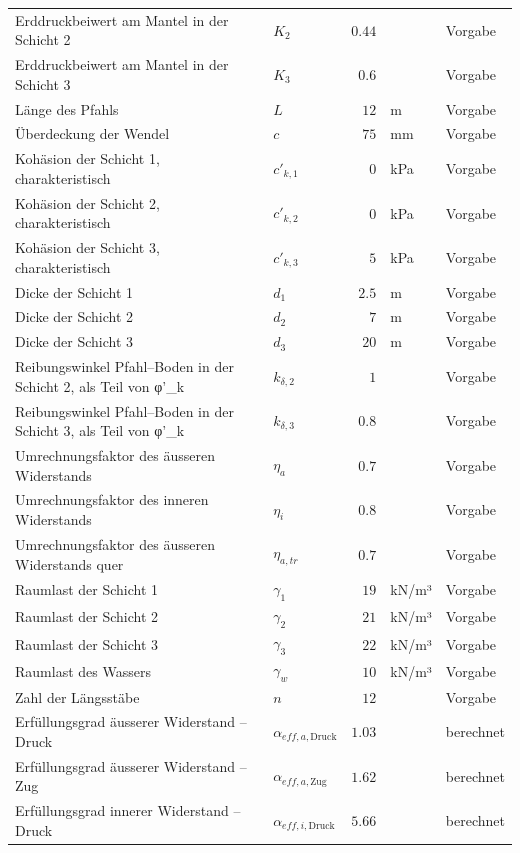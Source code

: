 \documentclass[11pt,a4paper]{article}
\begin{document}
\begin{xltabular}{\linewidth}{>{\raggedright\arraybackslash}Xlrll}
Erddruckbeiwert am Mantel in der Schicht 2 & $K_{2}$ & $0.44$ &  & Vorgabe \\
Erddruckbeiwert am Mantel in der Schicht 3 & $K_{3}$ & $0.6$ &  & Vorgabe \\
Länge des Pfahls & $L$ & $12$ & m & Vorgabe \\
Überdeckung der Wendel & $c$ & $75$ & mm & Vorgabe \\
Kohäsion der Schicht 1, charakteristisch & $c'_{k,1}$ & $0$ & kPa & Vorgabe \\
Kohäsion der Schicht 2, charakteristisch & $c'_{k,2}$ & $0$ & kPa & Vorgabe \\
Kohäsion der Schicht 3, charakteristisch & $c'_{k,3}$ & $5$ & kPa & Vorgabe \\
Dicke der Schicht 1 & $d_{1}$ & $2.5$ & m & Vorgabe \\
Dicke der Schicht 2 & $d_{2}$ & $7$ & m & Vorgabe \\
Dicke der Schicht 3 & $d_{3}$ & $20$ & m & Vorgabe \\
Reibungswinkel Pfahl–Boden in der Schicht 2, als Teil von φ'\_k & $k_{\delta,2}$ & $1$ &  & Vorgabe \\
Reibungswinkel Pfahl–Boden in der Schicht 3, als Teil von φ'\_k & $k_{\delta,3}$ & $0.8$ &  & Vorgabe \\
Umrechnungsfaktor des äusseren Widerstands & $\eta_a$ & $0.7$ &  & Vorgabe \\
Umrechnungsfaktor des inneren Widerstands & $\eta_i$ & $0.8$ &  & Vorgabe \\
Umrechnungsfaktor des äusseren Widerstands quer & $\eta_{a,tr}$ & $0.7$ &  & Vorgabe \\
Raumlast der Schicht 1 & $\gamma_{1}$ & $19$ & kN/m³ & Vorgabe \\
Raumlast der Schicht 2 & $\gamma_{2}$ & $21$ & kN/m³ & Vorgabe \\
Raumlast der Schicht 3 & $\gamma_{3}$ & $22$ & kN/m³ & Vorgabe \\
Raumlast des Wassers & $\gamma_w$ & $10$ & kN/m³ & Vorgabe \\
Zahl der Längsstäbe & $n$ & $12$ &  & Vorgabe \\
Erfüllungsgrad äusserer Widerstand – Druck & $\alpha_{eff,a,\text{Druck}}$ & $1.03$ &  & berechnet \\
Erfüllungsgrad äusserer Widerstand – Zug & $\alpha_{eff,a,\text{Zug}}$ & $1.62$ &  & berechnet \\
Erfüllungsgrad innerer Widerstand – Druck & $\alpha_{eff,i,\text{Druck}}$ & $5.66$ &  & berechnet \\

\end{xltabular}
\end{document}
